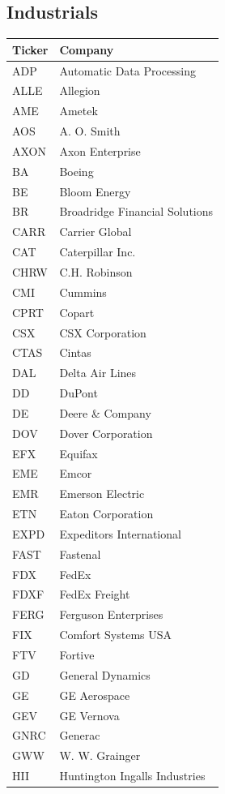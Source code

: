 \documentclass[11pt,a4paper]{article}
\begin{document}
\subsection{Industrials}
{\small
\begin{longtable}{lp{11cm}}
\hline
Ticker & Company \\
\hline
\endhead
ADP & Automatic Data Processing \\
ALLE & Allegion \\
AME & Ametek \\
AOS & A. O. Smith \\
AXON & Axon Enterprise \\
BA & Boeing \\
BE & Bloom Energy \\
BR & Broadridge Financial Solutions \\
CARR & Carrier Global \\
CAT & Caterpillar Inc. \\
CHRW & C.H. Robinson \\
CMI & Cummins \\
CPRT & Copart \\
CSX & CSX Corporation \\
CTAS & Cintas \\
DAL & Delta Air Lines \\
DD & DuPont \\
DE & Deere \& Company \\
DOV & Dover Corporation \\
EFX & Equifax \\
EME & Emcor \\
EMR & Emerson Electric \\
ETN & Eaton Corporation \\
EXPD & Expeditors International \\
FAST & Fastenal \\
FDX & FedEx \\
FDXF & FedEx Freight \\
FERG & Ferguson Enterprises \\
FIX & Comfort Systems USA \\
FTV & Fortive \\
GD & General Dynamics \\
GE & GE Aerospace \\
GEV & GE Vernova \\
GNRC & Generac \\
GWW & W. W. Grainger \\
HII & Huntington Ingalls Industries \\

\end{longtable}}
\end{document}
